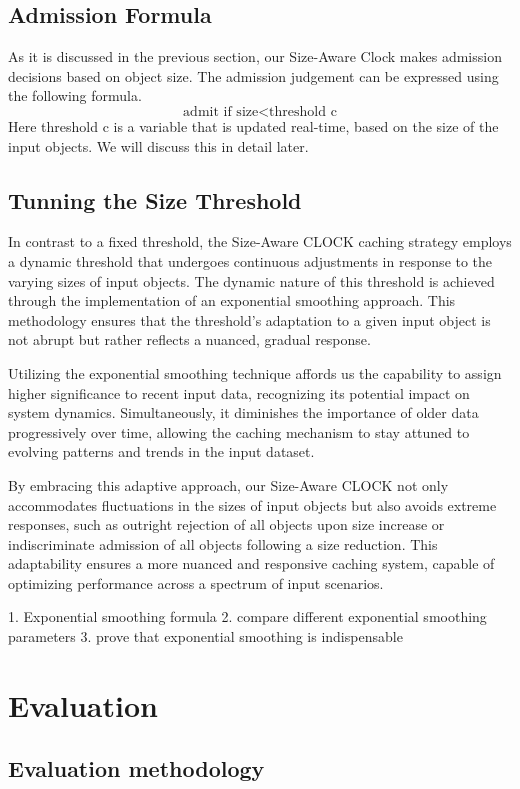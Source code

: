 \documentclass[conference]{IEEEtran}
\begin{document}
\subsection{Admission Formula}
As it is discussed in the previous section, our Size-Aware Clock makes admission decisions based on object size. The admission judgement can be expressed using the following formula.
\[
\text{admit if } \text{size} < \text{threshold} \text{ c}
\]
Here threshold c is a variable that is updated real-time, based on the size of the input objects. We will discuss this in detail later.

\subsection{Tunning the Size Threshold}
In contrast to a fixed threshold, the Size-Aware CLOCK caching strategy employs a dynamic threshold that undergoes continuous adjustments in response to the varying sizes of input objects. The dynamic nature of this threshold is achieved through the implementation of an exponential smoothing approach. This methodology ensures that the threshold's adaptation to a given input object is not abrupt but rather reflects a nuanced, gradual response.

Utilizing the exponential smoothing technique affords us the capability to assign higher significance to recent input data, recognizing its potential impact on system dynamics. Simultaneously, it diminishes the importance of older data progressively over time, allowing the caching mechanism to stay attuned to evolving patterns and trends in the input dataset.

By embracing this adaptive approach, our Size-Aware CLOCK not only accommodates fluctuations in the sizes of input objects but also avoids extreme responses, such as outright rejection of all objects upon size increase or indiscriminate admission of all objects following a size reduction. This adaptability ensures a more nuanced and responsive caching system, capable of optimizing performance across a spectrum of input scenarios. 

1. Exponential smoothing formula
2. compare different exponential smoothing parameters
3. prove that exponential smoothing is indispensable 


\section{Evaluation}
\subsection{Evaluation methodology}
\end{document}
